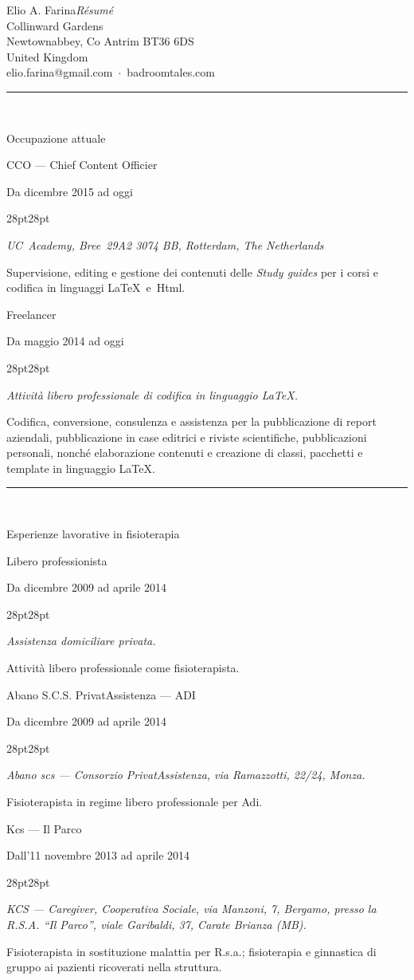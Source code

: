 \documentclass{article}
\newcommand{\titolo}[1]{\bgroup\rule{\linewidth}{1pt}\\[-14pt]
\null\hfill\fontsize{10pt}{12pt}\sc\selectfont\strut#1\\[7pt]\egroup}
\newcommand{\lavorofisio}[5]{%
{\fontsize{14pt}{17pt}\selectfont\strut#1}\hfill\strut#2\\[-7pt]
\begin{adjustwidth}{28pt}{28pt}
\fontsize{10pt}{12pt}\selectfont\strut\textit{#3}\\[2pt]
\fontsize{10pt}{12pt}\selectfont\strut#4\\[10pt]
\end{adjustwidth}}
\begin{document}
\raggedright
\\
elio.farina@gmail.com~$\cdot$~badroomtales.com
\egroup

\vfill
\titolo{Occupazione attuale}
\lavorofisio{{CCO} --- Chief Content Officier}{Da dicembre 2015 ad oggi}{UC~Academy, Bree~29A2 3074 BB, Rotterdam, The Netherlands}{Supervisione, editing e gestione dei contenuti delle \textit{Study guides} per i corsi e codifica in linguaggi \LaTeX\ e~{\sc Html}.}{}

\lavorofisio{Freelancer}{Da maggio 2014 ad oggi}{Attivit\`a libero professionale di codifica in linguaggio \LaTeX.}{Codifica, conversione, consulenza e assistenza per la pubblicazione di report aziendali, pubblicazione in case editrici e riviste scientifiche, pubblicazioni personali, nonch\'e elaborazione contenuti e creazione di classi, pacchetti e template in linguaggio \LaTeX.}{}

\vfill
\titolo{Esperienze lavorative in fisioterapia}
\lavorofisio{Libero professionista}{Da dicembre 2009 ad aprile 2014}{Assistenza domiciliare privata.}{Attivit\`a libero professionale come fisioterapista.}{pazienti privati.}

\lavorofisio{Abano S.C.S. PrivatAssistenza --- ADI}{Da dicembre 2009 ad aprile 2014}{Abano {scs} ---  Consorzio PrivatAssistenza, via Ramazzotti, 22/24, Monza.}{Fisioterapista in regime libero professionale per {\sc Adi}.}{Varie patologie che necessitano di assistenza domiciliare tramite ASL o privatamente.}

\lavorofisio{Kcs --- Il Parco}{Dall'11 novembre 2013 ad aprile 2014}{{KCS} ---  Caregiver, Cooperativa Sociale, via Manzoni, 7, Bergamo, presso la {R.S.A.} ``Il Parco'', viale Garibaldi, 37, Carate Brianza ({MB}).}{Fisioterapista in sostituzione malattia per {\sc R.s.a.}; fisioterapia e ginnastica di gruppo ai pazienti ricoverati nella struttura.}{anziani.}
\end{document}
